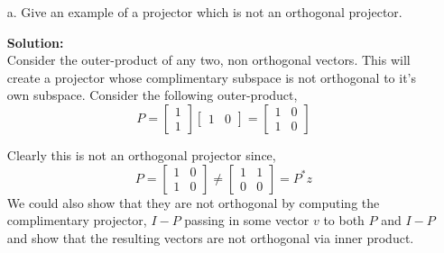 \documentclass[12pt]{article}
\makeatletter
\theoremstyle{homework}
\newenvironment{exercise}[1]
{\def\@currentlabel{#1}\exercisecore}
{\endexercisecore}
\newcommand{\localhead}[1]{\par\smallskip\noindent\textbf{#1}\nobreak\\}%
\newcommand\solution{\localhead{Solution:}}
\makeatother
\begin{document}
\begin{exercise}{P12}
  \begin{enumerate}
    \item[a.] Give an example of a projector which is not an orthogonal projector.\\
    \solution Consider the outer-product of any two, non orthogonal vectors. This will create a projector
    whose complimentary subspace is not orthogonal to it's own subspace.
    Consider the following outer-product, 
    \begin{equation*}
      P = 
      \begin{bmatrix}
        1\\
        1
      \end{bmatrix}
      \begin{bmatrix}
        1 & 0
      \end{bmatrix}
      =
      \begin{bmatrix}
        1 & 0\\
        1 & 0
      \end{bmatrix}
    \end{equation*}

    Clearly this is not an orthogonal projector since,
    \begin{equation*}
      P =       
      \begin{bmatrix}
        1 & 0\\
        1 & 0
      \end{bmatrix}
      \neq 
      \begin{bmatrix}
        1 & 1\\
        0 & 0
      \end{bmatrix}
      = P^*z
    \end{equation*}
    We could also show that they are not orthogonal by computing the complimentary projector, $I - P$
    passing in some vector $v$ to both $P$ and $I - P$ and show that the resulting vectors are not orthogonal via 
    inner product. 
    \vspace{.15in}
    

\end{enumerate}
\end{exercise}
\end{document}
